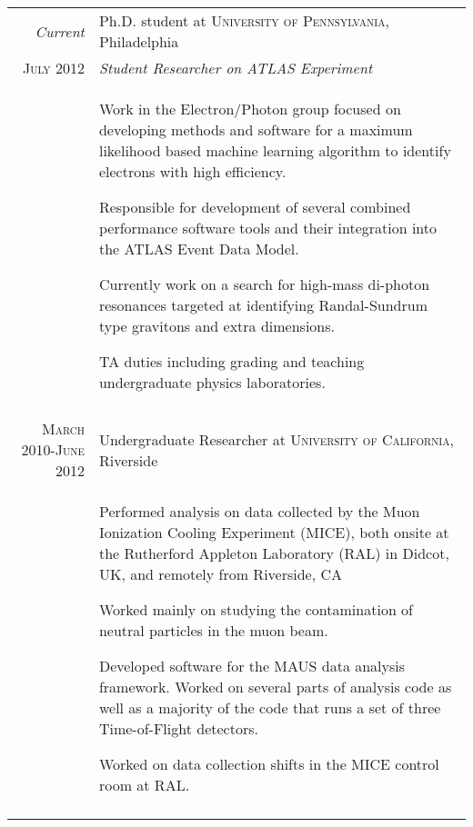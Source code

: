 \documentclass[a4paper,10pt]{article} %
\begin{document}
\begin{longtable}{r|p{11cm}}
\emph{Current}    & Ph.D. student at \textsc{University of Pennsylvania}, Philadelphia \\
\textsc{July 2012} & \emph{Student Researcher on ATLAS Experiment}\\
				   & \begin{itemize}
					 \footnotesize{
						\item Work in the Electron/Photon group focused on developing methods and software for a maximum likelihood based machine learning algorithm to identify electrons with high efficiency.
						\item Responsible for development of several combined performance software tools and their integration into the ATLAS Event Data Model.
						\item Currently work on a search for high-mass di-photon resonances targeted at identifying Randal-Sundrum type gravitons and extra dimensions.
						\item TA duties including grading and teaching undergraduate physics laboratories.
					 }
					 \end{itemize} \\
\multicolumn{2}{c}{} \\


\textsc{March 2010-June 2012} & Undergraduate Researcher at \textsc{University of California}, Riverside \emph{}\\
				  & \begin{itemize}
					\footnotesize{
						\item Performed analysis on data collected by the Muon Ionization Cooling Experiment (MICE), both onsite at the Rutherford Appleton Laboratory (RAL) in Didcot, UK, and remotely from Riverside, CA
						\item Worked mainly on studying the contamination of neutral particles in the muon beam.
					    \item Developed software for the MAUS data analysis framework.  Worked on several parts of analysis code as well as a majority of the code that runs a set of three Time-of-Flight detectors.
						\item Worked on data collection shifts in the MICE control room at RAL.
					}
			        \end{itemize} \\
\multicolumn{2}{c}{} \\


\end{longtable}
\end{document}
